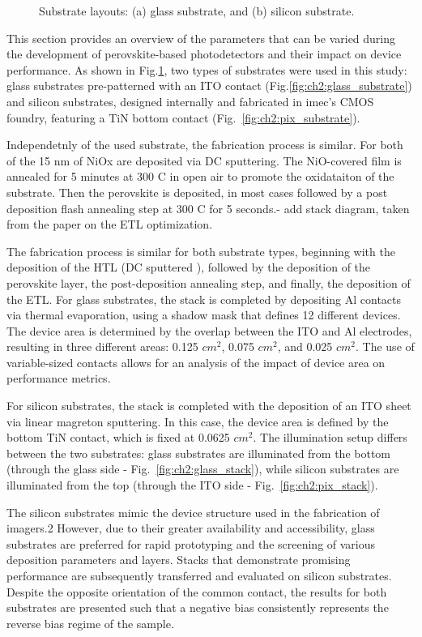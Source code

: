 \begin{figure}[htbp]
    \caption{Substrate layouts: (a) glass substrate, and (b) silicon substrate.}
    \label{fig:ch2:types_of_substrates}
\end{figure}


This section provides an overview of the parameters that can be varied during the development of perovskite-based photodetectors and their impact on device performance. As shown in Fig.\ref{fig:ch2:types_of_substrates}, two types of substrates were used in this study: glass substrates pre-patterned with an ITO contact (Fig.\ref{fig:ch2:glass_substrate}) and silicon substrates, designed internally and fabricated in imec's CMOS foundry, featuring a TiN bottom contact (Fig.~\ref{fig:ch2:pix_substrate}).

Independetnly of the used substrate, the fabrication process is similar. For both of the 15 nm of NiOx are deposited via DC sputtering. The NiO-covered film is annealed for 5 minutes at 300 C in open air to promote the oxidataiton of the substrate. Then the perovskite is deposited, in most cases followed by a post deposition flash annealing step at 300 C for 5 seconds.- add stack diagram, taken from the paper on the ETL optimization.

The fabrication process is similar for both substrate types, beginning with the deposition of the HTL (DC sputtered ), followed by the deposition of the perovskite layer, the post-deposition annealing step, and finally, the deposition of the ETL. For glass substrates, the stack is completed by depositing Al contacts via thermal evaporation, using a shadow mask that defines 12 different devices. The device area is determined by the overlap between the ITO and Al electrodes, resulting in three different areas: 0.125 $cm^2$, 0.075 $cm^2$, and 0.025 $cm^2$. The use of variable-sized contacts allows for an analysis of the impact of device area on performance metrics.

For silicon substrates, the stack is completed with the deposition of an ITO sheet via linear magreton sputtering. In this case, the device area is defined by the bottom TiN contact, which is fixed at 0.0625 $cm^2$. The illumination setup differs between the two substrates: glass substrates are illuminated from the bottom (through the glass side - Fig.~\ref{fig:ch2:glass_stack}), while silicon substrates are illuminated from the top (through the ITO side - Fig.~\ref{fig:ch2:pix_stack}). 

The silicon substrates mimic the device structure used in the fabrication of imagers.2 However, due to their greater availability and accessibility, glass substrates are preferred for rapid prototyping and the screening of various deposition parameters and layers. Stacks that demonstrate promising performance are subsequently transferred and evaluated on silicon substrates. Despite the opposite orientation of the common contact, the results for both substrates are presented such that a negative bias consistently represents the reverse bias regime of the sample.


